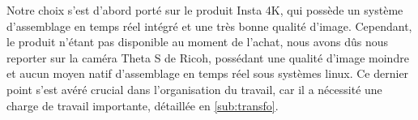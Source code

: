 			Notre choix s'est d'abord porté sur le produit Insta 4K\cite{insta360}, qui possède un système d'assemblage en temps réel intégré et une très bonne qualité d'image. Cependant, le produit n'étant pas disponible au moment de l'achat, nous avons dûs nous reporter sur la caméra Theta S de Ricoh\cite{ricohthetas}, possédant une qualité d'image moindre et aucun moyen natif d'assemblage en temps réel sous systèmes linux. Ce dernier point s'est avéré crucial dans l'organisation du travail, car il a nécessité une charge de travail importante, détaillée en \ref{sub:transfo}.
